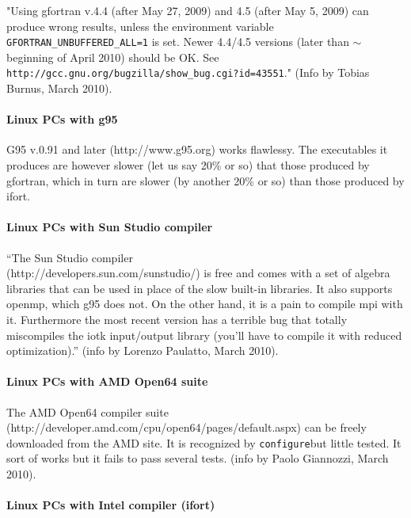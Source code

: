 \documentclass[12pt,a4paper]{article}
\def\configure{\texttt{configure}}
\begin{document}
"Using gfortran v.4.4 (after May 27, 2009) and 4.5 (after May 5, 2009) can 
produce wrong results, unless the environment variable
\texttt{GFORTRAN\_UNBUFFERED\_ALL=1} is set. Newer 4.4/4.5 versions
(later than $\sim$ beginning of April 2010) should be OK. See\\
\texttt{http://gcc.gnu.org/bugzilla/show\_bug.cgi?id=43551}."
(Info by Tobias Burnus, March 2010).

\paragraph{Linux PCs with g95}

G95 v.0.91 and later (http://www.g95.org) works flawlessy. 
The executables it produces are however slower (let us say 20\% or so) 
that those produced by gfortran, which in turn are slower 
(by another 20\% or so) than those produced by ifort.

\paragraph{Linux PCs with Sun Studio compiler}

``The Sun Studio compiler \\
(http://developers.sun.com/sunstudio/) is
free and comes  
with a set of algebra libraries that can be used in place of the slow 
built-in libraries. It also supports openmp, which g95 does not. On the 
other hand, it is a pain to compile mpi with it. Furthermore the most
recent version has a terrible bug that totally miscompiles the iotk 
input/output library (you'll have to compile it with reduced optimization).''
(info by Lorenzo Paulatto, March 2010).

\paragraph{Linux PCs with AMD Open64 suite}

The AMD Open64 compiler suite\\
(http://developer.amd.com/cpu/open64/pages/default.aspx)
can be freely downloaded from the AMD site.
It is recognized by \configure but little tested. It sort of works 
but it fails to pass several tests.
(info by Paolo Giannozzi, March 2010).

\paragraph{Linux PCs with Intel compiler (ifort)}
\end{document}
